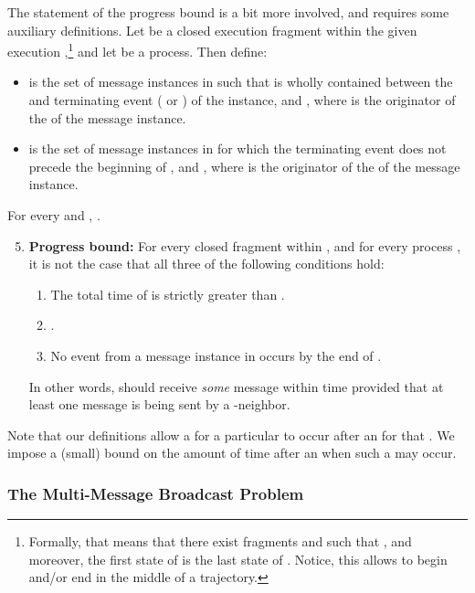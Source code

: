 The statement of the progress bound is a bit more involved, and
requires some auxiliary definitions.
Let  be a closed execution fragment within the given execution
,\footnote{Formally, that means that there
  exist fragments  and 
  such that , and moreover, the first
  state of  is the last state of . Notice,
  this allows  to begin and/or end in the middle of a trajectory.}
and let  be a process.
Then define:
\begin{itemize}
\item
 is the set of message instances in  such that
 is wholly contained between the  and terminating
event ( or ) of the instance, and , where 
is the originator of the  of the message instance.
\item
 is the set of message instances in  for
which the terminating event does not precede the beginning of , and
, where  is the originator of the  of the
message instance.
\end{itemize}

\begin{lemma}
For every  and ,
.
\end{lemma}

\begin{enumerate}
\setcounter{enumi}{4}
\item
{\bf Progress bound:}
For every closed fragment  within , and for every
process , it is not the case that all three of the following
conditions hold:
  \begin{enumerate}
  \item The total time of  is strictly greater than .
  \item .
  \item No  event from a message instance in 
    occurs by the end of .
  \end{enumerate}
In other words,  should receive {\em some} message within time
 provided that at least one message is being sent by a -neighbor.
\end{enumerate}

Note that our definitions allow a  for a particular 
to occur after an  for that .
We impose a (small) bound  on the amount of time
after an  when such a  may occur.






\subsubsection{The Multi-Message Broadcast Problem}
\label{sec:mmb:prelim}

